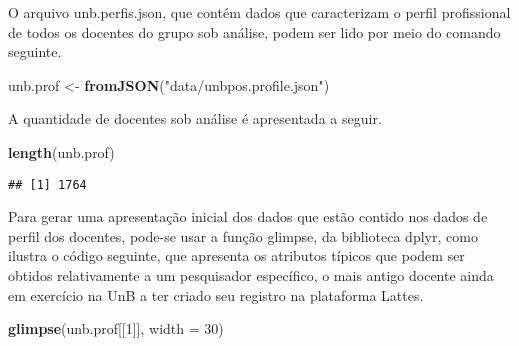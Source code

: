 \documentclass[]{article}
\newenvironment{Shaded}{\begin{snugshade}}{\end{snugshade}}
\newcommand{\KeywordTok}[1]{\textcolor[rgb]{0.13,0.29,0.53}{\textbf{#1}}}
\newcommand{\DataTypeTok}[1]{\textcolor[rgb]{0.13,0.29,0.53}{#1}}
\newcommand{\DecValTok}[1]{\textcolor[rgb]{0.00,0.00,0.81}{#1}}
\newcommand{\StringTok}[1]{\textcolor[rgb]{0.31,0.60,0.02}{#1}}
\newcommand{\NormalTok}[1]{#1}
\begin{document}
O arquivo unb.perfis.json, que contém dados que caracterizam o perfil
profissional de todos os docentes do grupo sob análise, podem ser lido
por meio do comando seguinte.

\begin{Shaded}
\begin{Highlighting}[]
\NormalTok{unb.prof <-}\StringTok{ }\KeywordTok{fromJSON}\NormalTok{(}\StringTok{"data/unbpos.profile.json"}\NormalTok{)}
\end{Highlighting}
\end{Shaded}

A quantidade de docentes sob análise é apresentada a seguir.

\begin{Shaded}
\begin{Highlighting}[]
\KeywordTok{length}\NormalTok{(unb.prof)}
\end{Highlighting}
\end{Shaded}

\begin{verbatim}
## [1] 1764
\end{verbatim}

Para gerar uma apresentação inicial dos dados que estão contido nos
dados de perfil dos docentes, pode-se usar a função glimpse, da
biblioteca dplyr, como ilustra o código seguinte, que apresenta os
atributos típicos que podem ser obtidos relativamente a um pesquisador
específico, o mais antigo docente ainda em exercício na UnB a ter criado
seu registro na plataforma Lattes.

\begin{Shaded}
\begin{Highlighting}[]
\KeywordTok{glimpse}\NormalTok{(unb.prof[[}\DecValTok{1}\NormalTok{]], }\DataTypeTok{width =} \DecValTok{30}\NormalTok{)}
\end{Highlighting}
\end{Shaded}
\end{document}
